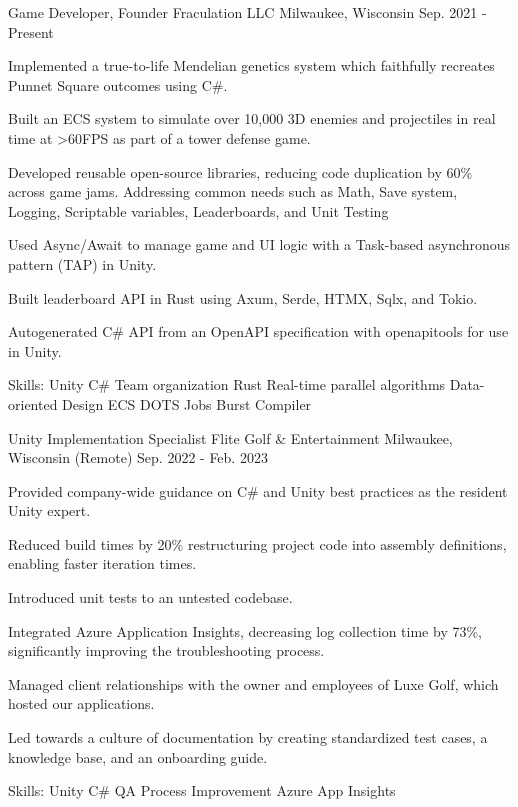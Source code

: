 \begin{cventries}
  \cventry
 {Game Developer, Founder} %
 {Fraculation LLC} %
 {Milwaukee, Wisconsin} %
 {Sep. 2021 - Present} %
 {
      \begin{cvitems} %
        \item {Implemented a true-to-life Mendelian genetics system which faithfully recreates Punnet Square outcomes using C\#.}
        \item {Built an ECS system to simulate over 10,000 3D enemies and projectiles in real time at >60FPS as part of a tower defense game.}
        \item {Developed reusable open-source libraries, reducing code duplication by 60\% across game jams. Addressing common needs such as Math, Save system, Logging, Scriptable variables, Leaderboards, and Unit Testing}
        \item {Used Async/Await to manage game and UI logic with a Task-based asynchronous pattern (TAP) in Unity.}
        \item {Built leaderboard API in Rust using Axum, Serde, HTMX, Sqlx, and Tokio.}
        \item {Autogenerated C\# API from an OpenAPI specification with openapitools for use in Unity.}
        \item {Skills: Unity \textbullet{} C\# \textbullet{} Team organization \textbullet{} Rust \textbullet{} Real-time parallel algorithms \textbullet{} Data-oriented Design \textbullet{} ECS \textbullet{} DOTS \textbullet{} Jobs \textbullet{} Burst Compiler}
      \end{cvitems}
 }

  \cventry
 {Unity Implementation Specialist} %
 {Flite Golf \& Entertainment} %
 {Milwaukee, Wisconsin (Remote)} %
 {Sep. 2022 - Feb. 2023} %
 {
      \begin{cvitems} %
        \item {Provided company-wide guidance on C\# and Unity best practices as the resident Unity expert.}
        \item {Reduced build times by 20\% restructuring project code into assembly definitions, enabling faster iteration times.}
        \item {Introduced unit tests to an untested codebase.}
        \item {Integrated Azure Application Insights, decreasing log collection time by 73\%, significantly improving the troubleshooting process.}
        \item {Managed client relationships with the owner and employees of Luxe Golf, which hosted our applications.}
        \item {Led towards a culture of documentation by creating standardized test cases, a knowledge base, and an onboarding guide.}
        \item {Skills: Unity \textbullet{} C\# \textbullet{} QA Process Improvement \textbullet{} Azure App Insights}
      \end{cvitems}
 }


\end{cventries}
